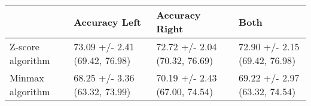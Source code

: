 \begin{tabular}{llll}
\toprule
{} &                  Accuracy Left &                 Accuracy Right &                           Both \\
\midrule
Z-score algorithm &  73.09 +/- 2.41 (69.42, 76.98) &  72.72 +/- 2.04 (70.32, 76.69) &  72.90 +/- 2.15 (69.42, 76.98) \\
Minmax algorithm  &  68.25 +/- 3.36 (63.32, 73.99) &  70.19 +/- 2.43 (67.00, 74.54) &  69.22 +/- 2.97 (63.32, 74.54) \\
\bottomrule
\end{tabular}
